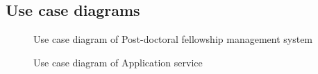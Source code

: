 \documentclass[12pt]{article}
\begin{document}
\subsection{Use case diagrams}
\begin{figure}[H]
\centering	
{}
\caption{Use case diagram of Post-doctoral fellowship management system}
\end{figure}

\begin{figure}[H]
\centering	
{}
\caption{Use case diagram of Application service}
\end{figure}
\end{document}
